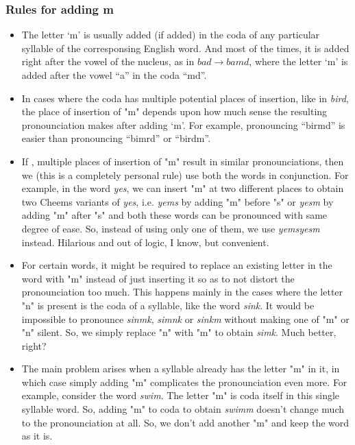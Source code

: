 \documentclass{article}
\begin{document}
\subsubsection{Rules for adding m}
\begin{itemize}
    \item The letter `m' is usually added (if added) in the coda of any particular syllable of the corresponsing English word. And most of the times, it is added right after the vowel of the nucleus, as in $bad \to bamd$, where the letter `m' is added after the vowel ``a'' in the coda ``md''.

    \item In cases where the coda has multiple potential places of insertion, like in \textit{bird}, the place of insertion of "m" depends upon how much sense the resulting pronounciation makes after adding `m'. For example, pronouncing ``birmd'' is easier than pronouncing ``bimrd'' or ``birdm''.

    \item If , multiple places of insertion of "m" result in similar pronounciations, then we (this is a completely personal rule) use both the words in conjunction. For example, in the word \textit{yes}, we can insert "m" at two different places to obtain two Cheems variants of \textit{yes}, i.e. \textit{yems} by adding "m" before "s" or \textit{yesm} by adding "m" after "s" and both these words can be pronounced with same degree of ease. So, instead of using only one of them, we use \textit{yemsyesm} instead. Hilarious and out of logic, I know, but convenient.

    \item For certain words, it might be required to replace an existing letter in the word with "m" instead of just inserting it so as to not distort the pronounciation too much. This happens mainly in the cases where the letter "n" is present is the coda of a syllable, like the word \textit{sink}. It would be impossible to pronounce \textit{sinmk}, \textit{simnk} or \textit{sinkm} without making one of "m" or "n" silent. So, we simply replace "n" with "m" to obtain \textit{simk}. Much better, right?

    \item The main problem arises when a syllable already has the letter "m" in it, in which case simply adding "m" complicates the pronounciation even more. For example, consider the word \textit{swim}. The letter "m" is coda itself in this single syllable word. So, adding "m" to coda to obtain \textit{swimm} doesn't change much to the pronounciation at all. So, we don't add another "m" and keep the word as it is.


\end{itemize}
\end{document}
